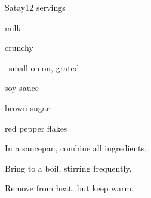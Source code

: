 \begin{recipe}{Satay}{}{12 servings}

\begin{ingredients}
\item {}  milk
\item \C{\half} crunchy 
\item \half{}~small onion, grated
\item {} soy sauce
\item {} brown sugar
\item \tp{\half} red pepper flakes
\end{ingredients}

\begin{directions}
\item In a saucepan, combine all ingredients.
\item Bring to a boil, stirring frequently.
\item Remove from heat, but keep warm.
\end{directions}

\end{recipe}
